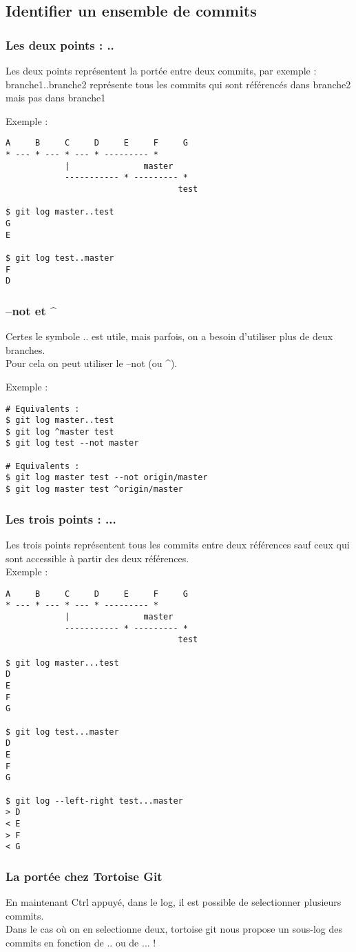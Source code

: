 \newpage
\subsection{Identifier un ensemble de commits}
\subsubsection*{Les deux points : ..}
Les deux points représentent la portée entre deux commits, par exemple :
branche1..branche2 représente tous les commits qui sont référencés dans branche2 mais pas dans branche1

Exemple :
\begin{verbatim}
A     B     C     D     E     F     G
* --- * --- * --- * --------- *
            |               master
            ----------- * --------- *
                                   test
                                   
$ git log master..test
G
E

$ git log test..master
F
D
\end{verbatim}

\subsubsection*{--not et \textasciicircum}
Certes le symbole .. est utile, mais parfois, on a besoin d'utiliser plus de deux branches.\\
Pour cela on peut utiliser le --not (ou \textasciicircum).

Exemple :
\begin{verbatim}
# Equivalents :
$ git log master..test
$ git log ^master test
$ git log test --not master

# Equivalents :
$ git log master test --not origin/master
$ git log master test ^origin/master

\end{verbatim}

\newpage
\subsubsection*{Les trois points : ...}

Les trois points représentent tous les commits entre deux références sauf ceux qui sont accessible à partir des deux références.\\

Exemple :
\begin{verbatim}
A     B     C     D     E     F     G
* --- * --- * --- * --------- *
            |               master
            ----------- * --------- *
                                   test
                                   
$ git log master...test
D
E
F
G

$ git log test...master
D
E
F
G

$ git log --left-right test...master
> D
< E
> F
< G
\end{verbatim}

\subsubsection{La portée chez Tortoise Git}

En maintenant Ctrl appuyé, dans le log, il est possible de selectionner plusieurs commits.\\
Dans le cas où on en selectionne deux, tortoise git nous propose un sous-log des commits en fonction de .. ou de ... !